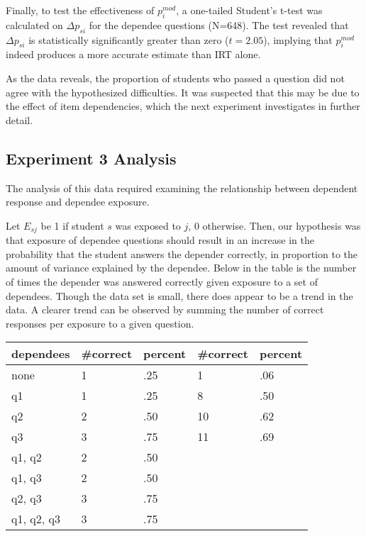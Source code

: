 Finally, to test the effectiveness of $p_i^{mod}$, a one-tailed Student's
t-test was calculated on $\Delta p_{si}$ for the dependee questions (N=648).
The test revealed that $\Delta p_{si}$ is statistically significantly greater
than zero ($t=2.05$), implying that $p_i^{mod}$ indeed produces a more accurate
estimate than IRT alone. 

As the data reveals, the proportion of students who passed a question did not
agree with the hypothesized difficulties.  It was suspected that this may be
due to the effect of item dependencies, which the next experiment investigates
in further detail.

\subsection{Experiment 3 Analysis}  

The analysis of this data required examining the relationship between dependent
response and dependee exposure.

Let $E_{sj}$ be 1 if student $s$ was exposed to $j$, 0 otherwise.  Then, our
hypothesis was that exposure of dependee questions should result in an increase
in the probability that the student answers the depender correctly, in
proportion to the amount of variance explained by the dependee.  Below in the
table is the number of times the depender was answered correctly given
exposure to a set of dependees.  Though the data set is small, there does
appear to be a trend in the data.  A clearer trend can be observed by summing
the number of correct responses per exposure to a given question.

\begin{center}
\begin{tabular}{|l|l|l|l|l|}
\hline
dependees    & \#correct &  percent & \#correct & percent \\ \hline
none         &  1  & .25  &1&  .06 \\ \hline
q1           &  1  & .25  &8&  .50 \\ \hline
q2           &  2  & .50  &10& .62 \\ \hline
q3           &  3  & .75  &11& .69 \\ \hline
q1, q2       &  2  & .50  && \\ \hline
q1, q3       &  2  & .50  && \\ \hline
q2, q3       &  3  & .75  && \\ \hline
q1, q2, q3   &  3  & .75  && \\ \hline
\end{tabular}
\end{center}


